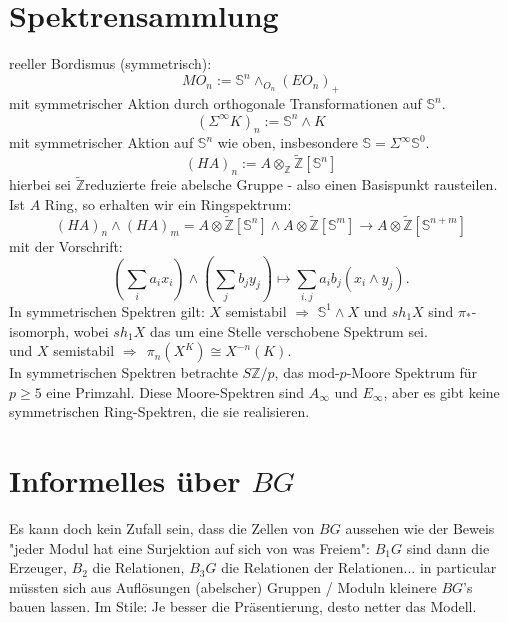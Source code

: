 \documentclass[11pt,twoside,a4paper]{scrbook} %
\begin{document}
\section{Spektrensammlung}
reeller Bordismus (symmetrisch):
$$MO_n:=\mathbb{S}^n\wedge_{O_n}(EO_n)_+$$
mit symmetrischer Aktion durch orthogonale Transformationen auf $\mathbb{S}^n$.\\
$$(\Sigma^\infty K)_n := \mathbb{S}^n\wedge K$$
mit symmetrischer Aktion auf $\mathbb{S}^n$ wie oben, insbesondere $\mathbb{S}=\Sigma^\infty\mathbb{S}^0$.\\
$$(HA)_n := A\otimes_{\mathbb{Z}}\tilde{\mathbb{Z}}[\mathbb{S}^n]$$
hierbei sei $\tilde{\mathbb{Z}}$reduzierte freie abelsche Gruppe - also einen Basispunkt rausteilen.\\
Ist $A$ Ring, so erhalten wir ein Ringspektrum:
$$(HA)_n\wedge(HA)_m = A\otimes \tilde{\mathbb{Z}}[\mathbb{S}^n]\wedge A\otimes\tilde{\mathbb{Z}}[\mathbb{S}^m] \rightarrow A\otimes\tilde{\mathbb{Z}}[\mathbb{S}^{n+m}]$$
mit der Vorschrift:
$$(\sum_ia_ix_i)\wedge(\sum_jb_jy_j)\mapsto\sum_{i,j}a_ib_j(x_i\wedge y_j).$$
In symmetrischen Spektren gilt: $X$ semistabil $\Rightarrow$ $\mathbb{S}^1\wedge X$ und $sh_1X$ sind $\pi_*$-isomorph, wobei $sh_1X$ das um eine Stelle verschobene Spektrum sei.\\
und $X$ semistabil $\Rightarrow~~ \pi_n(X^K) \cong X^{-n}(K)$.\\
In symmetrischen Spektren betrachte $S\mathbb{Z}/p$, das mod-$p$-Moore Spektrum f\"ur $p\geq5$ eine Primzahl. Diese Moore-Spektren sind $A_\infty$ und $E_\infty$, aber es gibt keine symmetrischen
Ring-Spektren, die sie realisieren.
\section{Informelles \"uber $BG$}
Es kann doch kein Zufall sein, dass die Zellen von $BG$ aussehen wie der Beweis "jeder Modul hat eine Surjektion auf sich von was Freiem": $B_1G$ sind dann die
Erzeuger, $B_2$ die Relationen, $B_3G$ die Relationen der Relationen... in particular m\"ussten sich aus Aufl\"osungen (abelscher) Gruppen / Moduln kleinere $BG$'s bauen
lassen. Im Stile: Je besser die Pr\"asentierung, desto netter das Modell. 
\end{document}
